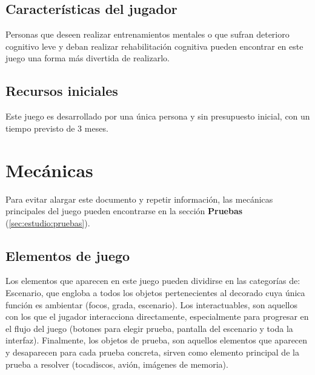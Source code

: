 \subsection{Características del jugador}
Personas que deseen realizar entrenamientos mentales o que sufran deterioro cognitivo leve y deban realizar rehabilitación cognitiva pueden encontrar en este juego una forma más divertida de realizarlo. 


\subsection{Recursos iniciales}
Este juego es desarrollado por una única persona y sin presupuesto inicial, con un tiempo previsto de 3 meses.


\section{Mecánicas}

Para evitar alargar este documento y repetir información, las mecánicas principales del juego pueden encontrarse en la sección \textbf{Pruebas} (\ref{sec:estudio:pruebas}).


\subsection{Elementos de juego}
Los elementos que aparecen en este juego pueden dividirse en las categorías de: Escenario, que engloba a todos los objetos pertenecientes al decorado cuya única función es ambientar (focos, grada, escenario). Los interactuables, son aquellos con los que el jugador interacciona directamente, especialmente para progresar en el flujo del juego (botones para elegir prueba, pantalla del escenario y toda la interfaz). Finalmente, los objetos de prueba, son aquellos elementos que aparecen y desaparecen para cada prueba concreta, sirven como elemento principal de la prueba a resolver (tocadiscos, avión, imágenes de memoria).

